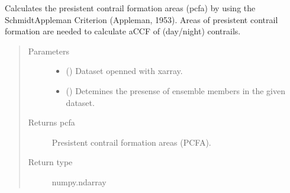 \documentclass[a4paper,11pt,english]{sphinxmanual}
\begin{document}
\begin{fulllineitems}
\label{\detokenize{modules:envlib.contrail.get_pcfa}}
Calculates the presistent contrail formation areas (pcfa) by using the Schmidt\sphinxhyphen{}Appleman Criterion (Appleman, 1953). Areas of presistent contrail formation are needed to calculate aCCF of (day/night) contrails.
\begin{quote}\begin{description}
\item[{Parameters}] \leavevmode\begin{itemize}
\item {} 
 () \textendash{} Dataset openned with xarray.

\item {} 
 () \textendash{} Detemines the presense of ensemble members in the given dataset.

\end{itemize}

\item[{Returns pcfa}] \leavevmode
Presistent contrail formation areas (PCFA).

\item[{Return type}] \leavevmode
numpy.ndarray

\end{description}\end{quote}

\end{fulllineitems}

\end{document}
